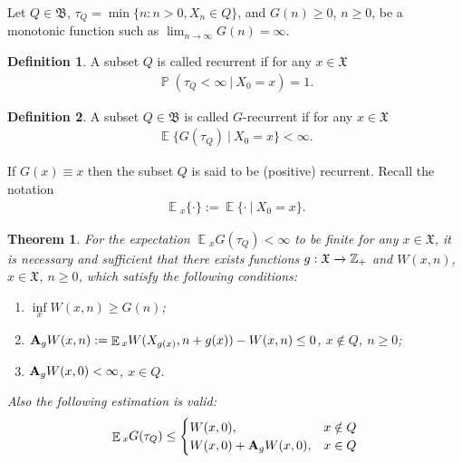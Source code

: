 \documentclass[10pt, reqno]{amsart}
\newtheorem{repeated_theorem}{Theorem}
\theoremstyle{definition}
\newtheorem{definition}{Definition}[section]
\newcommand{\aasVar}{Q} %
\newcommand{\asaVar}{\mathfrak{B}} %
\newcommand{\astVar}{\tau} %
\newcommand{\gtfVar}{G} %
\newcommand{\wtfVar}{W} %
\newcommand{\atoVar}{\mathbf{A}} %
\newcommand{\assVar}{\mathfrak{X}} %
\newcommand{\integers}{\mathbb{Z}} %
\DeclareMathOperator*{\E}{\mathbb{E}}
\DeclareMathOperator*{\Pb}{\mathbb{P}}
\begin{document}
	Let $\aasVar \in \asaVar$, $\astVar_{\aasVar} = \min\{n : n > 0, X_{n} \in \aasVar\}$, and $\gtfVar(n) \geq 0$, $n \geq 0$, be a monotonic function such as $\lim_{n \xrightarrow{} \infty}\gtfVar(n) = \infty$.
	\begin{definition}
		A subset $\aasVar$ is called recurrent if for any $x \in \assVar$
		\begin{gather*}
		\Pb(\astVar_{\aasVar} < \infty \: | \: X_{0} = x) = 1.
		\end{gather*}
	\end{definition}
	\begin{definition}
		A subset $\aasVar \in \asaVar$ is called $\gtfVar$-recurrent if for any $x \in \assVar$
		\begin{gather}
		\E\{\gtfVar(\astVar_{\aasVar}) \: | \: X_{0} = x\} < \infty.
		\end{gather}
	\end{definition}
	If $\gtfVar(x) \equiv x$ then the subset $\aasVar$ is said to be (positive) recurrent. Recall the notation
	\begin{gather}
	\E{}_{x}\{\cdot\} := \E\{\cdot \: | \: X_{0} = x\}.
	\end{gather}
	\begin{repeated_theorem}
		For the expectation $\E{}_{x}\gtfVar(\astVar_{\aasVar}) < \infty$ to be finite for any $x \in \assVar$, it is necessary and sufficient that there exists functions $\gffVar:\assVar \xrightarrow{} \integers_{+}$ and $\wtfVar(x, n)$, $x \in \assVar$, $n \geq 0$, which satisfy the following conditions:
		\begin{enumerate}
			\item[(a)] $\underset{x}{\inf}\wtfVar(x, n) \geq \gtfVar(n)$;
			\item[(b)] $\atoVar_{\gffVar}\wtfVar(x, n) := \E{}_{x}\wtfVar(X_{\gffVar(x)}, n+\gffVar(x)) - \wtfVar(x, n) \leq 0$, $x \notin \aasVar$, $n \geq 0$;
			\item[(c)] $\atoVar_{\gffVar}\wtfVar(x, 0) < \infty$, $x \in \aasVar$.
		\end{enumerate}
		Also the following estimation is valid:
		\begin{gather}
		\E{}_{x}\gtfVar(\astVar_{\aasVar}) \leq \begin{cases}
		\wtfVar(x, 0), & x \notin \aasVar \\
		\wtfVar(x, 0) + \atoVar_{\gffVar}\wtfVar(x, 0), & x \in \aasVar
		\end{cases}
		\label{main_G_W_inequality}
		\end{gather}
		\label{generalized_kalashnikov_theorem}
	\end{repeated_theorem}
\end{document}
